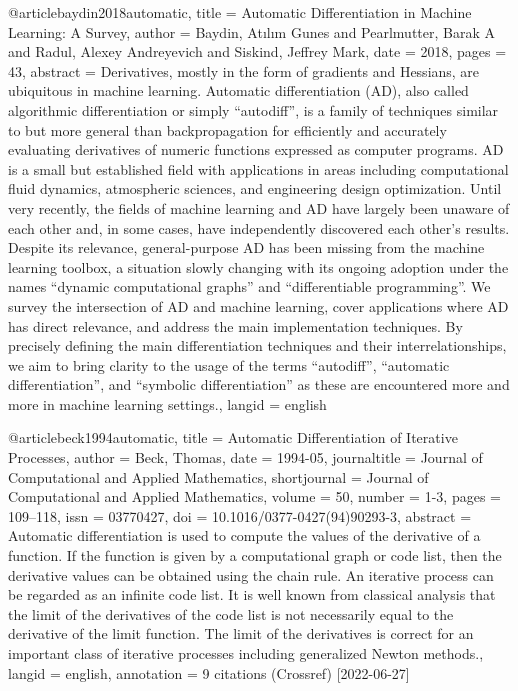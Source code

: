 @article{baydin2018automatic,
  title = {Automatic {{Diﬀerentiation}} in {{Machine Learning}}: A {{Survey}}},
  author = {Baydin, Atılım Gunes and Pearlmutter, Barak A and Radul, Alexey Andreyevich and Siskind, Jeffrey Mark},
  date = {2018},
  pages = {43},
  abstract = {Derivatives, mostly in the form of gradients and Hessians, are ubiquitous in machine learning. Automatic differentiation (AD), also called algorithmic differentiation or simply “autodiff”, is a family of techniques similar to but more general than backpropagation for efficiently and accurately evaluating derivatives of numeric functions expressed as computer programs. AD is a small but established field with applications in areas including computational fluid dynamics, atmospheric sciences, and engineering design optimization. Until very recently, the fields of machine learning and AD have largely been unaware of each other and, in some cases, have independently discovered each other’s results. Despite its relevance, general-purpose AD has been missing from the machine learning toolbox, a situation slowly changing with its ongoing adoption under the names “dynamic computational graphs” and “differentiable programming”. We survey the intersection of AD and machine learning, cover applications where AD has direct relevance, and address the main implementation techniques. By precisely defining the main differentiation techniques and their interrelationships, we aim to bring clarity to the usage of the terms “autodiff”, “automatic differentiation”, and “symbolic differentiation” as these are encountered more and more in machine learning settings.},
  langid = {english}
}

@article{beck1994automatic,
  title = {Automatic Differentiation of Iterative Processes},
  author = {Beck, Thomas},
  date = {1994-05},
  journaltitle = {Journal of Computational and Applied Mathematics},
  shortjournal = {Journal of Computational and Applied Mathematics},
  volume = {50},
  number = {1-3},
  pages = {109--118},
  issn = {03770427},
  doi = {10.1016/0377-0427(94)90293-3},
  abstract = {Automatic differentiation is used to compute the values of the derivative of a function. If the function is given by a computational graph or code list, then the derivative values can be obtained using the chain rule. An iterative process can be regarded as an infinite code list. It is well known from classical analysis that the limit of the derivatives of the code list is not necessarily equal to the derivative of the limit function. The limit of the derivatives is correct for an important class of iterative processes including generalized Newton methods.},
  langid = {english},
  annotation = {9 citations (Crossref) [2022-06-27]}
}

